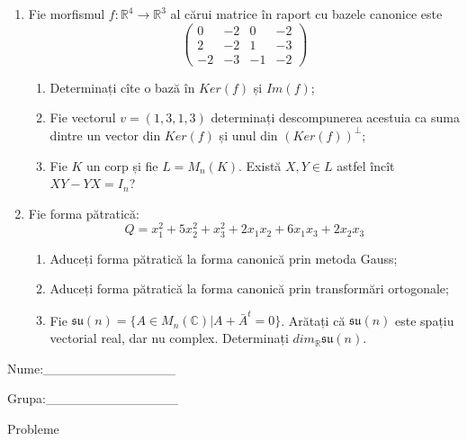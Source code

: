 \documentclass{article}
\begin{document}
\begin{enumerate}
 \item Fie morfismul $f:\mathbb{R}^4 \to \mathbb{R}^3$ al cărui matrice în raport cu bazele canonice este
$$\begin{pmatrix}
0&-2&0&-2\\
2&-2&1&-3\\
-2&-3&-1&-2
\end{pmatrix}$$

\begin{enumerate}
\item Determinați cîte o bază în $Ker(f)$ și $Im(f)$;
\item Fie vectorul $v=(1,3,1,3)$ determinați descompunerea acestuia ca suma dintre un vector din $Ker(f)$ și unul din $(Ker(f))^\perp$;
\item Fie $K$ un corp și fie $L=M_n(K)$. Există $X,Y \in L$ astfel încît $XY-YX=I_n$?  
\end{enumerate}
\item Fie forma pătratică:
$$Q= x_1^2+5x_2^2+x_3^2+2x_1x_2+6x_1x_3+2x_2x_3$$

\begin{enumerate}
\item Aduceți forma pătratică la forma canonică prin metoda Gauss;
\item Aduceți forma pătratică la forma canonică prin transformări ortogonale;
\item Fie $\mathfrak{su}(n)=\{ A \in M_n(\mathbb{C}) | A+\bar{A}^t=0\}$. Arătați că $\mathfrak{su}(n)$ este spațiu vectorial real, dar nu complex.
Determinați $dim_{\mathbb{R}}\mathfrak{su}(n)$.
\end{enumerate}
\end{enumerate}
\newpage
\begin{flushright}
Nume:\_\_\_\_\_\_\_\_\_\_\_\_\_\_
 
 
Grupa:\_\_\_\_\_\_\_\_\_\_\_\_\_\_
\end{flushright}
\begin{center}
\vspace{2cm}
{\Large Probleme}
\vspace{2cm}
\end{center}
\end{document}
